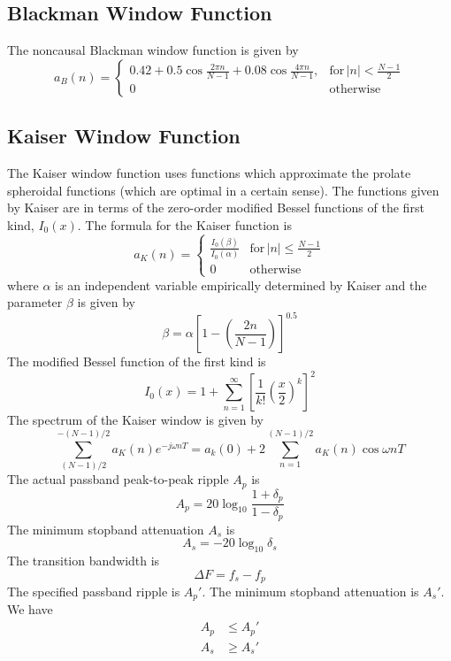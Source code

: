 \documentclass[11pt]{book}
\theoremstyle{example}
\begin{document}
\subsection{Blackman Window Function}
The noncausal Blackman window function is given by
\begin{equation}
	a_B(n)=
	\begin{cases}
		0.42+0.5\cos{\frac{2{\pi}n}{N-1}}+0.08\cos{\frac{4{\pi}n}{N-1}}, & \mathrm{for}\,|n|<\frac{N-1}{2}\\
		0 & \mathrm{otherwise}
	\end{cases}
\end{equation}

\subsection{Kaiser Window Function}
The Kaiser window function uses functions which approximate the prolate spheroidal functions (which are optimal in a certain sense). The functions given by Kaiser are in terms of the zero-order modified Bessel functions of the first kind, $I_0(x)$. The formula for the Kaiser function is
\begin{equation}
	a_K(n)=
	\begin{cases}
		\frac{I_0(\beta)}{I_0(\alpha)} & \mathrm{for}\,|n|\leq\frac{N-1}{2}\\
		0 & \mathrm{otherwise}
	\end{cases}
\end{equation}
where $\alpha$ is an independent variable empirically determined by Kaiser and the parameter $\beta$ is given by
\begin{equation}
	\beta=\alpha\left[1-\left(\frac{2n}{N-1}\right)\right]^{0.5}
\end{equation}
The modified Bessel function of the first kind is
\begin{equation}
	I_0(x)=1+\sum_{n=1}^\infty{\left[\frac{1}{k!}\left(\frac{x}{2}\right)^k\right]^2}
\end{equation}
The spectrum of the Kaiser window is given by
\begin{equation}
	\sum_{(N-1)/2}^{-(N-1)/2}{a_K(n)e^{-j{\omega}nT}}=a_k(0)+2\sum_{n=1}^{(N-1)/2}{a_K(n)\cos{{\omega}nT}}
\end{equation}
The actual passband peak-to-peak ripple $A_p$ is
\begin{equation}
	A_p=20\log_{10}{\frac{1+\delta_p}{1-\delta_p}}
\end{equation}
The minimum stopband attenuation $A_s$ is
\begin{equation}
	A_s=-20\log_{10}{\delta_s}
\end{equation}
The transition bandwidth is
\begin{equation}
	{\Delta}F=f_s-f_p
\end{equation}
The specified passband ripple is $A_p'$.
The minimum stopband attenuation is $A_s'$.
We have
\begin{align}
	A_p&{\leq}A_p'\\
	A_s&{\geq}A_s'
\end{align}
\end{document}
